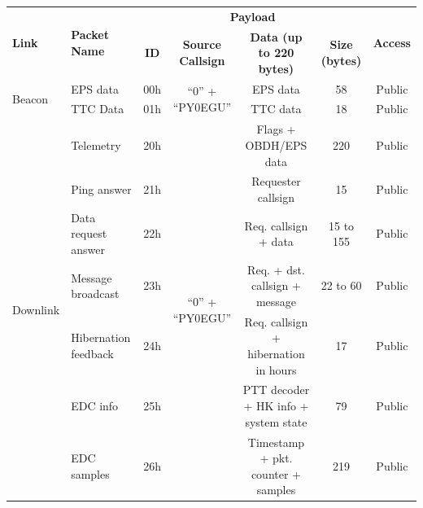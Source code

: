 \begin{landscape}
    \begin{table}[ht]
        \centering
        \begin{tabular}{llccccc}
            \toprule[1.5pt]
            \multirow{2}{*}{\textbf{Link}} & \multirow{2}{*}{\textbf{Packet Name}} & \multicolumn{4}{c}{\textbf{Payload}} & \multirow{2}{*}{\textbf{Access}} \\
            \cmidrule{3-6}
                                      &                       & \textbf{ID}  & \textbf{Source Callsign}   & \textbf{Data (up to 220 bytes)}            & \textbf{Size (bytes)} & \\
            \midrule
            \multirow{2}{*}{Beacon}   & EPS data              & 00h & \multirow{2}{*}{``0'' + ``PY0EGU''} & EPS data                                   & 58                    & Public \\
                                      & TTC Data              & 01h &                                     & TTC data                                   & 18                    & Public \\
            \midrule
            \multirow{8}{*}{Downlink} & Telemetry             & 20h & \multirow{8}{*}{``0'' + ``PY0EGU''} & Flags + OBDH/EPS data                      & 220                   & Public \\
                                      & Ping answer           & 21h &                                     & Requester callsign                         & 15                    & Public \\
                                      & Data request answer   & 22h &                                     & Req. callsign + data                       & 15 to 155             & Public \\
                                      & Message broadcast     & 23h &                                     & Req. + dst. callsign + message             & 22 to 60              & Public \\
                                      & Hibernation feedback  & 24h &                                     & Req. callsign + hibernation in hours       & 17                    & Public \\
                                      & EDC info              & 25h &                                     & PTT decoder + HK info + system state       & 79                    & Public \\
                                      & EDC samples           & 26h &                                     & Timestamp + pkt. counter + samples         & 219                   & Public \\

\end{tabular}
\end{table}
\end{landscape}
